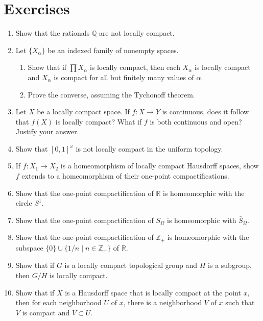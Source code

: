\section*{Exercises}
\begin{enumerate}[itemsep=0.4em, parsep=0pt, topsep=0pt, partopsep=0pt, leftmargin=*, label=\arabic*., ref=\arabic*]
\item Show that the rationals \(\mathbb{Q}\) are not locally compact.
\item Let \(\{ X_{\alpha }\}\) be an indexed family of nonempty spaces.
 \begin{enumerate}[itemsep=0.2em, parsep=0pt, topsep=0pt, partopsep=0pt, leftmargin=*, label=(\alph*), align=left]
 \item Show that if \(\prod {X}_{\alpha }\) is locally compact, then each \(X_{\alpha }\) is locally compact and \(X_{\alpha }\) is compact for all but finitely many values of \(\alpha\).
 \item Prove the converse, assuming the Tychonoff theorem.
 \end{enumerate}
\item Let \(X\) be a locally compact space. If \(f : X \rightarrow Y\) is continuous, does it follow that \(f( X)\) is locally compact? What if \(f\) is both continuous and open? Justify your answer.
\item Show that \({[ 0,1] }^{\omega }\) is not locally compact in the uniform topology.
\item If \(f : X_{1} \rightarrow {X}_{2}\) is a homeomorphism of locally compact Hausdorff spaces, show \(f\) extends to a homeomorphism of their one-point compactifications.
\item Show that the one-point compactification of \(\mathbb{R}\) is homeomorphic with the circle \(S^{1}\).
\item Show that the one-point compactification of \(S_{\Omega }\) is homeomorphic with \(\bar{S}_{\Omega }\).
\item Show that the one-point compactification of \(\mathbb{Z}_{ + }\) is homeomorphic with the subspace \(\{ 0\} \cup \{ {1/n \mid n \in {\mathbb{Z}}_{ + }}\}\) of \(\mathbb{R}\).
\item Show that if \(G\) is a locally compact topological group and \(H\) is a subgroup, then \(G/H\) is locally compact.
\item Show that if \(X\) is a Hausdorff space that is locally compact at the point \(x\), then for each neighborhood \(U\) of \(x\), there is a neighborhood \(V\) of \(x\) such that \(\bar{V}\) is compact and \(\bar{V} \subset U\).


\end{enumerate}
